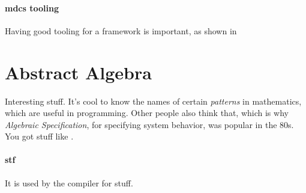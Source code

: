 \paragraph{\gls{mdcs} tooling} Having good tooling for a framework is important,
as shown in \cite{toolMcds}


\section{Abstract Algebra}

Interesting stuff. It's cool to know the names of certain \textit{patterns} in
mathematics, which are useful in programming. Other people also think that,
which is why \textit{Algebraic Specification}, for specifying system behavior,
was popular in the 80s. You got stuff like \cite{cafeObj}.


\paragraph{\gls{stf}} It is used by the compiler \cite{wig} for stuff.
